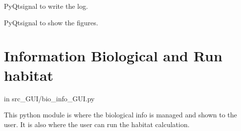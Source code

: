 \documentclass[letterpaper,10pt,english]{sphinxmanual}
\begin{document}
\begin{fulllineitems}
\begin{fulllineitems}
\end{fulllineitems}


\begin{fulllineitems}
\label{\detokenize{index:src_GUI.estimhab_GUI.StatModUseful.send_log}}
PyQtsignal to write the log.

\end{fulllineitems}


\begin{fulllineitems}
\label{\detokenize{index:src_GUI.estimhab_GUI.StatModUseful.show_fig}}
PyQtsignal to show the figures.

\end{fulllineitems}


\end{fulllineitems}



\section{Information Biological and Run habitat}
\label{\detokenize{index:information-biological-and-run-habitat}}
in src\_GUI/bio\_info\_GUI.py

This python module is where the biological info is managed and shown to the user.
It is also where the user can run the habitat calculation.
\label{\detokenize{index:module-src_GUI.bio_info_GUI}}
\end{document}
